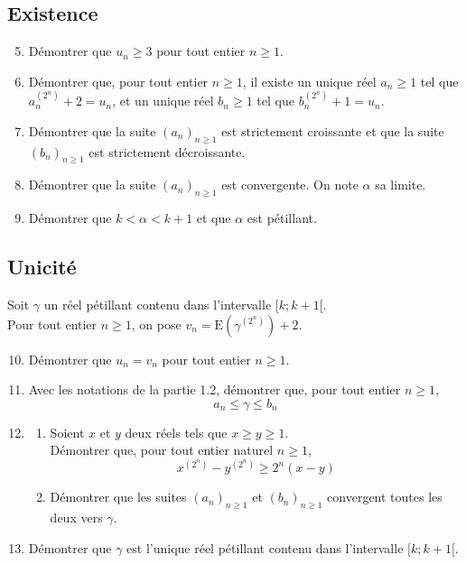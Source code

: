 \documentclass[landscape,twocolumn,leqno,a4paper,10pt]{report} %
\newcommand\n{\noindent}
\renewcommand{\geq}{\geqslant}
\renewcommand{\leq}{\leqslant}
\begin{document}
\subsection{Existence}


\begin{enumerate}\setcounter{enumi}{4}
	\item Démontrer que $u_{n} \geq 3$ pour tout entier $n \geq 1$.
	\item Démontrer que, pour tout entier $n \geq 1$, il existe un unique réel $a_{n} \geq 1$ tel que $a_{n}^{\left(2^{n}\right)}+2=u_{n}$, et un unique réel $b_{n} \geq 1$ tel que $b_{n}^{\left(2^{n}\right)}+1=u_{n}$.
	\item Démontrer que la suite $\left(a_{n}\right)_{n \geq 1}$ est strictement croissante et que la suite $\left(b_{n}\right)_{n \geq 1}$ est strictement décroissante.
	\item Démontrer que la suite $\left(a_{n}\right)_{n \geq 1}$ est convergente. On note $\alpha$ sa limite.
	\item Démontrer que $k<\alpha<k+1$ et que $\alpha$ est pétillant.
\end{enumerate}


\subsection{Unicité}

\n Soit $\gamma$ un réel pétillant contenu dans l'intervalle $[k ; k+1[$.\\
Pour tout entier $n \geq 1$, on pose $v_{n}=\mathrm{E}\left(\gamma^{\left(2^{n}\right)}\right)+2$.

\begin{enumerate}\setcounter{enumi}{9}
	\item Démontrer que $u_{n}=v_{n}$ pour tout entier $n \geq 1$.
	\item Avec les notations de la partie 1.2, démontrer que, pour tout entier $n \geq 1$,
	$$a_{n} \leq \gamma \leq b_{n}$$
	\item \begin{enumerate}
		\item Soient $x$ et $y$ deux réels tels que $x \geq y \geq 1$.\\
		Démontrer que, pour tout entier naturel $n \geq 1$,
		$$x^{\left(2^{n}\right)}-y^{\left(2^{n}\right)} \geq 2^{n}(x-y)$$
		\item Démontrer que les suites $\left(a_{n}\right)_{n \geq 1}$ et $\left(b_{n}\right)_{n \geq 1}$ convergent toutes les deux vers $\gamma$.
	\end{enumerate}
	\item Démontrer que $\gamma$ est l'unique réel pétillant contenu dans l'intervalle $[k ; k+1[$.
\end{enumerate}
\end{document}
